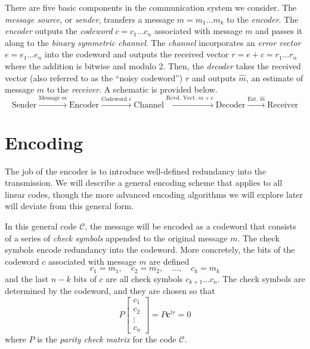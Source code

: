 \documentclass[12pt,twoside]{reedthesis}
\theoremstyle{definition}
\begin{document}
There are five basic components in the communication system we consider. The \textit{message source}, or \textit{sender}, transfers a message $m = m_1 \ldots m_k$ to the \textit{encoder}. The \textit{encoder} outputs the \textit{codeword} $c = c_1\ldots c_n$ associated with message $m$ and passes it along to the \textit{binary symmetric channel}. The \textit{channel} incorporates an \textit{error vector} $e = e_1 \ldots e_n$ into the codeword and outputs the received vector $r = e + c = r_1 \ldots r_n$ where the addition is bitwise and modulo 2. Then, the \textit{decoder} takes the received vector (also referred to as the ``noisy codeword'') $r$ and outputs $\hat{m}$, an estimate of message $m$ to the \textit{receiver}. A schematic is provided below.
\begin{equation*}
\text{Sender} \xrightarrow{\text{Message }m} \text{Encoder} \xrightarrow{\text{Codeword }c} \text{Channel} \xrightarrow{\text{Rcvd.~Vect.~}m+e} \text{Decoder} \xrightarrow{\text{Est. }\hat{m}} \text{Receiver}
\end{equation*}

\section{Encoding}
The job of the encoder is to introduce well-defined redundancy into the transmission. We will describe a general encoding scheme that applies to all linear codes, though the more advanced encoding algorithms we will explore later will deviate from this general form.

In this general code $\mathscr{C}$, the message will be encoded as a codeword that consists of a series of \textit{check symbols} appended to the original message $m$. The check symbols encode redundancy into the codeword. More concretely, the bits of the codeword $c$ associated with message $m$ are defined
\begin{equation*}
c_1 = m_1, \quad c_2 = m_2, \quad \ldots,\quad c_k = m_k
\end{equation*}
and the last $n-k$ bits of $c$ are all check symbols $c_{k+1} \ldots c_n$. The check symbols are determined by the codeword, and they are chosen so that 
\begin{equation*}
P \begin{bmatrix}
c_{1}\\
c_{2}\\
\vdots\\
c_n
\end{bmatrix} = 
P \mathbf{c}^{tr}= 0
\end{equation*}
where $P$ is the \textit{parity check matrix} for the code $\mathscr{C}$.
\end{document}
